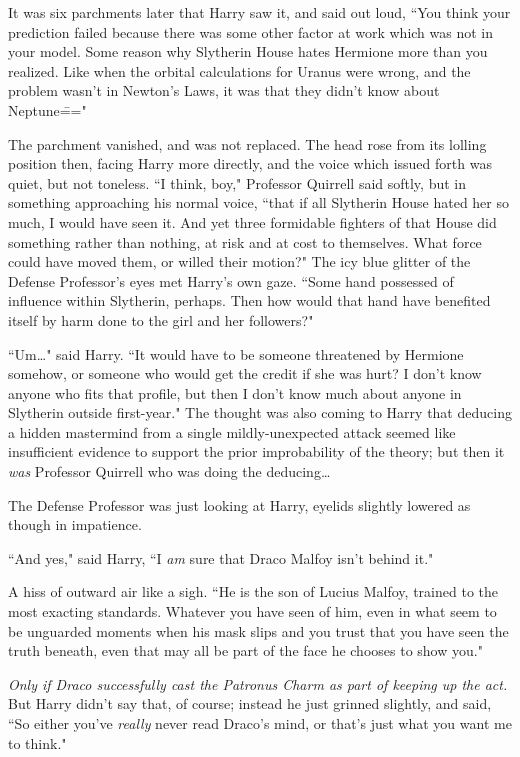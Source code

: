 It was six parchments later that Harry saw it, and said out loud, ``You think your prediction failed because there was some other factor at work which was not in your model. Some reason why Slytherin House hates Hermione more than you realized. Like when the orbital calculations for Uranus were wrong, and the problem wasn't in Newton's Laws, it was that they didn't know about Neptune\==="

The parchment vanished, and was not replaced. The head rose from its lolling position then, facing Harry more directly, and the voice which issued forth was quiet, but not toneless. ``I think, boy," Professor Quirrell said softly, but in something approaching his normal voice, ``that if all Slytherin House hated her so much, I would have seen it. And yet three formidable fighters of that House did something rather than nothing, at risk and at cost to themselves. What force could have moved them, or willed their motion?" The icy blue glitter of the Defense Professor's eyes met Harry's own gaze. ``Some hand possessed of influence within Slytherin, perhaps. Then how would that hand have benefited itself by harm done to the girl and her followers?"

``Um{\ldots}" said Harry. ``It would have to be someone threatened by Hermione somehow, or someone who would get the credit if she was hurt? I don't know anyone who fits that profile, but then I don't know much about anyone in Slytherin outside first-year." The thought was also coming to Harry that deducing a hidden mastermind from a single mildly-unexpected attack seemed like insufficient evidence to support the prior improbability of the theory; but then it \emph{was} Professor Quirrell who was doing the deducing{\ldots}

The Defense Professor was just looking at Harry, eyelids slightly lowered as though in impatience.

``And yes," said Harry, ``I \emph{am} sure that Draco Malfoy isn't behind it."

A hiss of outward air like a sigh. ``He is the son of Lucius Malfoy, trained to the most exacting standards. Whatever you have seen of him, even in what seem to be unguarded moments when his mask slips and you trust that you have seen the truth beneath, even that may all be part of the face he chooses to show you."

\emph{Only if Draco successfully cast the Patronus Charm as part of keeping up the act.} But Harry didn't say that, of course; instead he just grinned slightly, and said, ``So either you've \emph{really} never read Draco's mind, or that's just what you want me to think."

